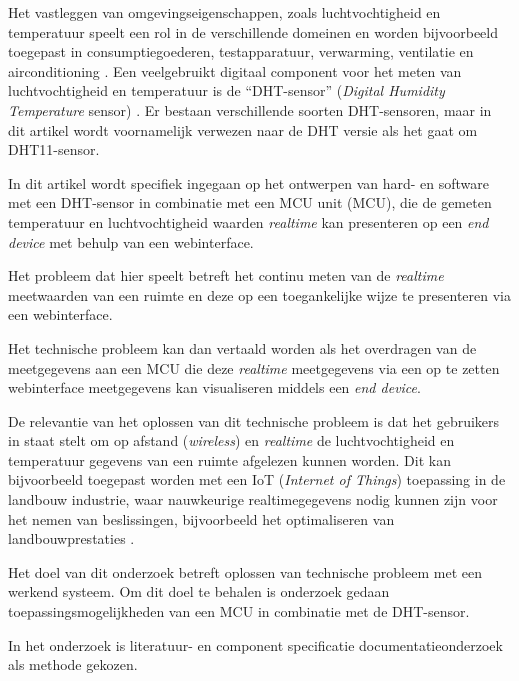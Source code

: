 Het vastleggen van omgevingseigenschappen, zoals luchtvochtigheid en temperatuur speelt een rol in de verschillende domeinen en worden bijvoorbeeld toegepast in consumptiegoederen, testapparatuur, verwarming, ventilatie en airconditioning \cite{10}. 
Een veelgebruikt digitaal component voor het meten van luchtvochtigheid en temperatuur is de ``DHT-sensor'' (\textit{Digital Humidity Temperature} sensor) \cite{7855973}. 
Er bestaan verschillende soorten DHT-sensoren, maar in dit artikel wordt voornamelijk verwezen naar de DHT versie als het gaat om DHT11-sensor. 

In dit artikel wordt specifiek ingegaan op het ontwerpen van hard- en software met een DHT-sensor in combinatie met een MCU unit (MCU),  
die de gemeten temperatuur en luchtvochtigheid waarden \textit{realtime} kan presenteren op een \textit{end device} met behulp van een webinterface. 

Het probleem dat hier speelt betreft het continu meten van de \textit{realtime} meetwaarden van een ruimte en deze op een toegankelijke wijze te presenteren via een webinterface. 

Het technische probleem kan dan vertaald worden als het overdragen van de meetgegevens aan een MCU die deze \textit{realtime} 
meetgegevens via een op te zetten webinterface meetgegevens kan visualiseren middels een \textit{end device}. 

De relevantie van het oplossen van dit technische probleem is dat het gebruikers in staat stelt om op afstand (\textit{wireless}) en \textit{realtime} de luchtvochtigheid en 
temperatuur gegevens van een ruimte afgelezen kunnen worden. 
Dit kan bijvoorbeeld toegepast worden met een IoT (\textit{Internet of Things}) toepassing in de landbouw industrie, waar nauwkeurige realtimegegevens nodig kunnen zijn voor het nemen van beslissingen, bijvoorbeeld het optimaliseren van landbouwprestaties \cite{articl2e}. 

Het doel van dit onderzoek betreft oplossen van technische probleem met een werkend systeem. 
Om dit doel te behalen is onderzoek gedaan toepassingsmogelijkheden van een MCU in combinatie met de DHT-sensor.  

In het onderzoek is literatuur- en component specificatie documentatieonderzoek als methode gekozen. 

